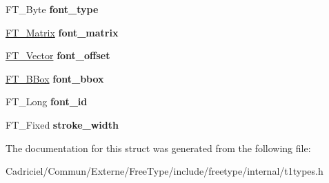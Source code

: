 \begin{DoxyCompactItemize}
\item 
\hypertarget{struct_t1___font_rec___a9d37e54d3a584f823dca80eca624f700}{F\-T\-\_\-\-Byte {\bfseries font\-\_\-type}}\label{struct_t1___font_rec___a9d37e54d3a584f823dca80eca624f700}

\item 
\hypertarget{struct_t1___font_rec___a87c95f084851d2bb9e48889e9444b2a8}{\hyperlink{struct_f_t___matrix__}{F\-T\-\_\-\-Matrix} {\bfseries font\-\_\-matrix}}\label{struct_t1___font_rec___a87c95f084851d2bb9e48889e9444b2a8}

\item 
\hypertarget{struct_t1___font_rec___ab6e773e20df1c585dc14ee3fa7ed1737}{\hyperlink{struct_f_t___vector__}{F\-T\-\_\-\-Vector} {\bfseries font\-\_\-offset}}\label{struct_t1___font_rec___ab6e773e20df1c585dc14ee3fa7ed1737}

\item 
\hypertarget{struct_t1___font_rec___a86fd1af4c03e34b7d151054ccc7525a7}{\hyperlink{struct_f_t___b_box__}{F\-T\-\_\-\-B\-Box} {\bfseries font\-\_\-bbox}}\label{struct_t1___font_rec___a86fd1af4c03e34b7d151054ccc7525a7}

\item 
\hypertarget{struct_t1___font_rec___a14178cf438d1a5fcb31b7d398d06cfaf}{F\-T\-\_\-\-Long {\bfseries font\-\_\-id}}\label{struct_t1___font_rec___a14178cf438d1a5fcb31b7d398d06cfaf}

\item 
\hypertarget{struct_t1___font_rec___ac71ace1872be6b2adbd3d6f5ca456d23}{F\-T\-\_\-\-Fixed {\bfseries stroke\-\_\-width}}\label{struct_t1___font_rec___ac71ace1872be6b2adbd3d6f5ca456d23}

\end{DoxyCompactItemize}


The documentation for this struct was generated from the following file\-:\begin{DoxyCompactItemize}
\item 
Cadriciel/\-Commun/\-Externe/\-Free\-Type/include/freetype/internal/t1types.\-h\end{DoxyCompactItemize}
